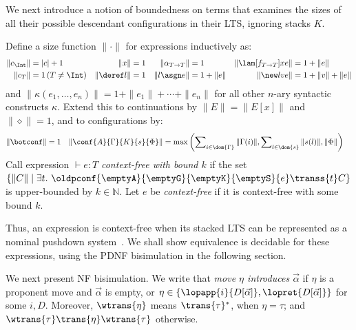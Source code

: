 We next introduce a notion of boundedness on terms that examines the sizes of all their possible descendant configurations in their LTS, ignoring stacks $K$.

\begin{definition}\label{def:cxt-free-term}
  Define a size function $\|\cdot\|$ for expressions inductively as:
  \begin{align*}
    \|c_\Int\| &= |c|+1\ & \|x\| &=1 &\|\alpha_{T\to T}\|&=1
    & \|\lam[f_{T\to T}] x e\| &= 1+\|e\|\\
\|c_T\| &= 1\,(T\neq\Int) &
 \|\deref l\| &=1 & \|l \asgn e\| &= 1+\|e\| &\|\new l v e\| &= 1+\|v\|+\|e\|
  \end{align*}
  and $\|\kappa(e_1,\dots,e_n)\|=1+\|e_1\|+\cdots+\|e_n\|$ for all other $n$-ary syntactic constructs $\kappa$. Extend this to
continuations by $\|E\|=\|E[x]\|$ and $\|\diamond\|=1$, and to
  configurations by:
\begin{align*}
\|\botconf\| &=1 & \|\conf{A}{\Gamma}{K}{s}{\Phi}\| &= \max\left(\sum\nolimits_{i\in\dom{\Gamma}}\|\Gamma(i)\|,\sum\nolimits_{l\in\dom{s}}\|s(l)\|,\|\Phi\|\right)
 \end{align*}
Call expression $\vdash e:T$ \emph{context-free with bound $k$} if the set 
$
\{ \|C\| \mid \exists t.\ \oldpconf{\emptyA}{\emptyG}{\emptyK}{\emptyS}{e}\transs{t}C\}
$
is upper-bounded by $k\in\mathbb N$. Let $e$ be \emph{context-free} if it is context-free with some bound $k$.
\end{definition}

Thus, an expression is context-free when its stacked LTS can be represented as a nominal pushdown system~\cite{ChengK98,MurawskiRT17}. We shall show equivalence is decidable for these expressions, {using the PDNF bisimulation in the following section}.

We next present NF bisimulation. We write that \emph{move $\eta$ introduces $\vec\alpha$} if $\eta$ is a proponent move and $\vec\alpha$ is empty, or $\eta\in\{\lopapp{i}{D[\vec\alpha]},\lopret{D[\vec\alpha]}\}$ for some $i,D$.
Moreover, $\wtrans{\eta}$ means ${\trans{\tau}}{}^*$, when $\eta=\tau$; and $\wtrans{\tau}\trans{\eta}\wtrans{\tau}$ otherwise.


